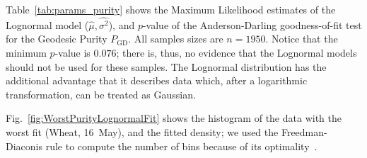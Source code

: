 \documentclass[journal]{IEEEtran}
\begin{document}
{Table~\ref{tab:params_purity} shows the Maximum Likelihood estimates of the Lognormal model ($\widehat \mu,\widehat{\sigma^2}$), and $p$-value of the Anderson-Darling goodness-of-fit test for the Geodesic Purity $P_{\text{GD}}$.
All samples sizes are $n=1950$.
Notice that the minimum $p$-value is $0.076$; there is, thus, no evidence that the Lognormal models should not be used for these samples.
The Lognormal distribution has the additional advantage that it describes data which, after a logarithmic transformation, can be treated as Gaussian.

Fig.~\ref{fig:WorstPurityLognormalFit} shows the histogram of the data with the worst fit (Wheat, 16~May), and the fitted density; we used the Freedman-Diaconis rule to compute the number of bins because of its optimality~\cite{OntheHistogramAsaDensityEstimatorL2Theory1981}.

}
\end{document}
